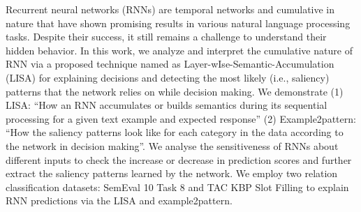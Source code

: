 Recurrent neural networks (RNNs) are temporal networks and cumulative in nature that have shown promising results in various natural language processing tasks. Despite their success, it still remains a challenge to understand their hidden behavior. In this work, we analyze and interpret the cumulative nature of RNN via a proposed technique named as Layer-wIse-Semantic-Accumulation (LISA) for explaining decisions and detecting the most likely (i.e., saliency) patterns that the network relies on while decision making. We demonstrate (1) LISA: ``How an RNN accumulates or builds semantics during its sequential processing for a given text example and expected response'' (2) Example2pattern: ``How the saliency patterns look like for each category in the data according to the network in decision making''. We analyse the sensitiveness of RNNs about different inputs to check the increase or decrease in prediction scores and further extract the saliency patterns learned by the network. We employ two relation classification datasets: SemEval 10 Task 8 and TAC KBP Slot Filling to explain RNN predictions via the LISA and example2pattern.
